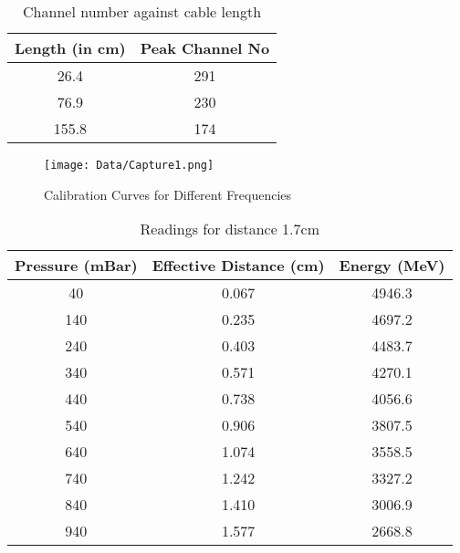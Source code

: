 \documentclass[a4paper]{article}
\begin{document}
\begin{table}[H]
\begin{center}
\begin{tabular}{@{}cc@{}}
\toprule
Length (in cm) & Peak Channel No \\ \midrule
26.4           & 291             \\
76.9           & 230             \\
155.8          & 174             \\ \bottomrule
\end{tabular}
\caption{Channel number against cable length}
\end{center}
\end{table}


\begin{center}
\begin{figure}[H]
\begin{center}
\texttt{[image: Data/Capture1.png]}
\caption{Calibration Curves for Different Frequencies}
\end{center}
\end{figure}
\end{center}


\begin{table}[H]
\begin{center}
\begin{tabular}{@{}ccc@{}}
\toprule
Pressure (mBar) & Effective Distance (cm) & Energy (MeV) \\ \midrule
40              & 0.067                   & 4946.3       \\
140             & 0.235                   & 4697.2       \\
240             & 0.403                   & 4483.7       \\
340             & 0.571                   & 4270.1       \\
440             & 0.738                   & 4056.6       \\
540             & 0.906                   & 3807.5       \\
640             & 1.074                   & 3558.5       \\
740             & 1.242                   & 3327.2       \\
840             & 1.410                   & 3006.9       \\
940             & 1.577                   & 2668.8       \\ \bottomrule
\end{tabular}
\caption{Readings for distance 1.7cm}
\end{center}
\end{table}
\end{document}
